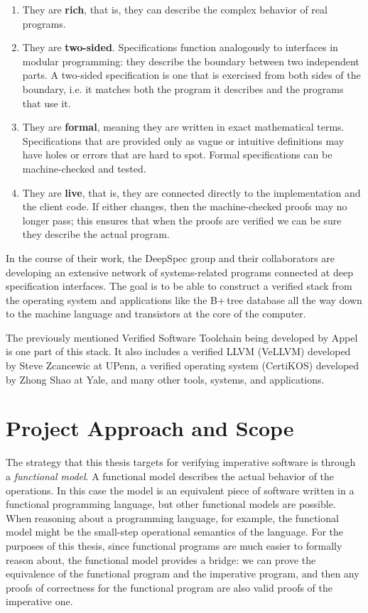 \documentclass[12pt]{article}
\begin{document}
\begin{enumerate}
\item They are \textbf{rich}, that is, they can describe the complex behavior of real programs.
 
\item They are \textbf{two-sided}. Specifications function analogously to interfaces in modular programming: they describe the boundary between two independent parts. A two-sided specification is one that is exercised from both sides of the boundary, i.e. it matches both the program it describes and the programs that use it.

\item They are \textbf{formal}, meaning they are written in exact mathematical terms. Specifications that are provided only as vague or intuitive definitions may have holes or errors that are hard to spot. Formal specifications can be machine-checked and tested.

\item They are \textbf{live}, that is, they are connected directly to the implementation and the client code. If either changes, then the machine-checked proofs may no longer pass; this ensures that when the proofs are verified we can be sure they describe the actual program.
\end{enumerate}

In the course of their work, the DeepSpec group and their collaborators are developing an extensive network of systems-related programs connected at deep specification interfaces. The goal is to be able to construct a verified stack from the operating system and applications like the B+\,tree database all the way down to the machine language and transistors at the core of the computer.

The previously mentioned Verified Software Toolchain being developed by Appel is one part of this stack. It also includes a verified LLVM (VeLLVM) developed by Steve Zcancewic at UPenn, a verified operating system (CertiKOS) developed by Zhong Shao at Yale, and many other tools, systems, and applications.

\clearpage

\section{Project Approach and Scope}

The strategy that this thesis targets for verifying imperative software is through a \textit{functional model}. A functional model describes the actual behavior of the operations. In this case the model is an equivalent piece of software written in a functional programming language, but other functional models are possible. When reasoning about a programming language, for example, the functional model might be the small-step operational semantics of the language. For the purposes of this thesis, since functional programs are much easier to formally reason about, the functional model provides a bridge: we can prove the equivalence of the functional program and the imperative program, and then any proofs of correctness for the functional program are also valid proofs of the imperative one.
\end{document}
